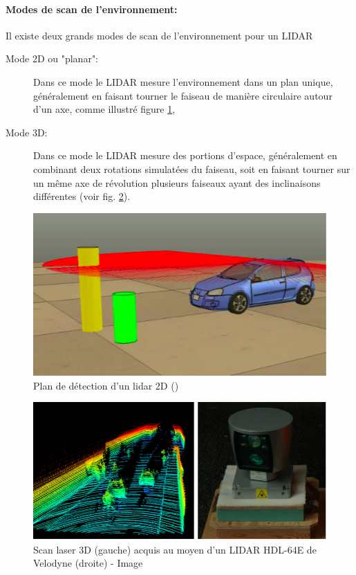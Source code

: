 \documentclass[12pt,a4paper]{report}
\begin{document}
		\paragraph*{Modes de scan de l'environnement:} Il existe deux grands modes de scan de l'environnement pour un LIDAR
		
		\begin{description}
			\item[Mode 2D ou  "planar":] Dans ce mode le LIDAR mesure l'environnement dans un plan unique, généralement en faisant tourner le faiseau de manière circulaire autour d'un axe, comme illustré figure \ref{fig:lidar2d},
			\item[Mode 3D:] Dans ce mode le LIDAR mesure des portions d'espace, généralement en combinant deux rotations simulatées du faiseau, soit en faisant tourner sur un même axe de révolution plusieurs faiseaux ayant des inclinaisons différentes (voir fig. \ref{fig:lidar3d}).
		\end{description}
	
	\begin{figure}[h!]
		\centering
		\includegraphics[width=0.7\linewidth]{img/lidar2d}
		\caption[Lidar 2D]{Plan de détection d'un lidar 2D (\cite{yalcin_approaches_2013})}
		\label{fig:lidar2d}
	\end{figure}

	\begin{figure}[h!]
	\centering
	\includegraphics[width=0.7\linewidth]{img/lidar3d}
	\caption[lidar3d]{Scan laser 3D (gauche) acquis au moyen d'un LIDAR \hspace{\textwidth} HDL-64E de Velodyne (droite) - Image \cite{steinbauer_tedusar_2014}}
	\label{fig:lidar3d}
	\end{figure}
\end{document}
